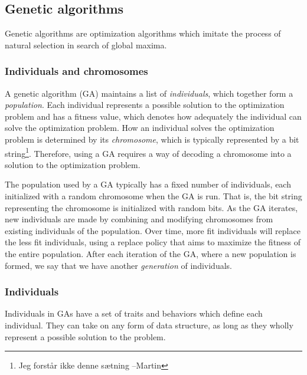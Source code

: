 \subsection{Genetic algorithms} 
Genetic algorithms are optimization algorithms which imitate the process of natural selection in search of global maxima.

\subsubsection{Individuals and chromosomes}
A genetic algorithm (GA) maintains a list of \emph{individuals}, which together form a \emph{population}. Each individual represents a possible solution to the optimization problem and has a fitness value, which denotes how adequately the individual can solve the optimization problem. How an individual solves the optimization problem is determined by its \emph{chromosome}, which is typically represented by a bit string\footnote{Jeg forstår ikke denne sætning --Martin}. Therefore, using a GA requires a way of decoding a chromosome into a solution to the optimization problem.

The population used by a GA typically has a fixed number of individuals, each initialized with a random chromosome when the GA is run. That is, the bit string representing the chromosome is initialized with random bits. As the GA iterates, new individuals are made by combining and modifying chromosomes from existing individuals of the population. Over time, more fit individuals will replace the less fit individuals, using a replace policy that aims to maximize the fitness of the entire population. After each iteration of the GA, where a new population is formed, we say that we have another \emph{generation} of individuals.

\subsubsection{Individuals}
Individuals in GAs have a set of traits and behaviors which define each individual. They can take on any form of data structure, as long as they wholly represent a possible solution to the problem. 




